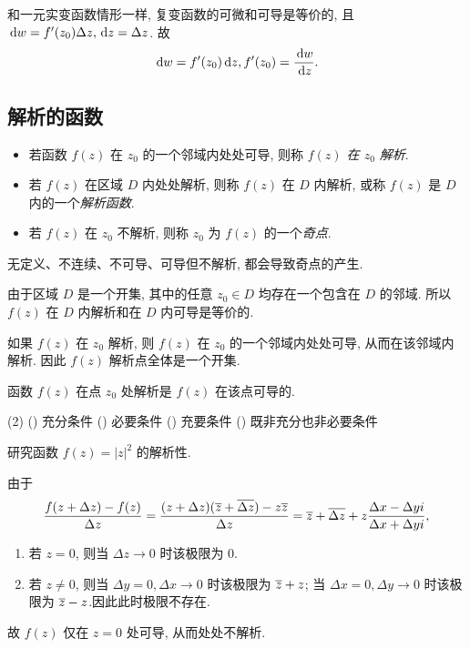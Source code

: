 和一元实变函数情形一样, 复变函数的可微和可导是等价的, 且 $\,\mathrm{d} w=f'(z_0)\Delta z, \,\mathrm{d} z=\Delta z$.
故
  \[\,\mathrm{d} w=f'(z_0)\,\mathrm{d} z, f'(z_0)=\dfrac{\,\mathrm{d} w}{\,\mathrm{d} z}.\]


\subsection{解析的函数}

\begin{definition}[解析和奇点]
	\begin{itemize}
		\item 若函数 $f(z)$ 在 $z_0$ 的一个邻域内处处可导, 则称 \emph{$f(z)$ 在 $z_0$ 解析}.
		\item 若 $f(z)$ 在区域 $D$ 内处处解析, 则称 $f(z)$ 在 $D$ 内解析, 或称 $f(z)$ 是 $D$ 内的一个\emph{解析函数}.
		\item 若 $f(z)$ 在 $z_0$ 不解析, 则称 $z_0$ 为 $f(z)$ 的一个\emph{奇点}.
	\end{itemize}
\end{definition}

无定义、不连续、不可导、可导但不解析, 都会导致奇点的产生.

由于区域 $D$ 是一个开集, 其中的任意 $z_0\in D$ 均存在一个包含在 $D$ 的邻域. 所以 \alert{$f(z)$ 在 $D$ 内解析和在 $D$ 内可导是等价的}.

如果 $f(z)$ 在 $z_0$ 解析, 则 $f(z)$ 在 $z_0$ 的一个邻域内处处可导, 从而在该邻域内解析. 因此 \alert{$f(z)$ 解析点全体是一个开集}.

\begin{exercise}
	函数 $f(z)$ 在点 $z_0$ 处解析是 $f(z)$ 在该点可导的\fillbrace{}.
	\begin{taskschoice}(2)
		() 充分条件
		() 必要条件
		() 充要条件
		() 既非充分也非必要条件
	\end{taskschoice}
\end{exercise}

\begin{example}
	研究函数 $f(z)=|z|^2$ 的解析性.
\end{example}
\begin{solution}
	由于
	\[
		\frac{f(z+\Delta z)-f(z)}{\Delta z}
		=\frac{(z+\Delta z)(\overline z+\overline{\Delta z})-z\overline z}{\Delta z}
		=\overline z+\overline{\Delta z}+z\frac{\Delta x-\Delta yi}{\Delta x+\Delta yi},
	\]
  \begin{enumerate}
    \item 若 $z=0$, 则当 $\Delta z\to 0$ 时该极限为 $0$.
    \item 若 $z\neq0$, 则当 $\Delta y=0,\Delta x\to 0$ 时该极限为 $\overline z+z$; 当 $\Delta x=0,\Delta y\to 0$ 时该极限为 $\overline z-z$.因此此时极限不存在.
  \end{enumerate}
	故 $f(z)$ 仅在 $z=0$ 处可导, 从而处处不解析.
\end{solution}



